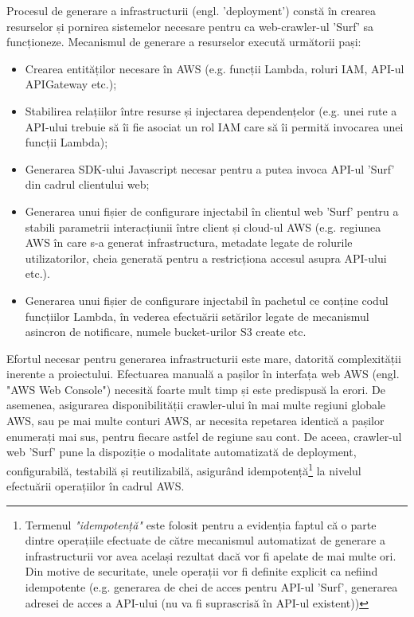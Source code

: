 \newcommand{\descriereIdempotenta}{Termenul \textit{"idempotență"} este folosit pentru a evidenția faptul că o parte dintre operațiile efectuate de către mecanismul automatizat de generare a infrastructurii vor avea același rezultat dacă vor fi apelate de mai multe ori. Din motive de securitate, unele operații vor fi definite explicit ca nefiind idempotente (e.g. generarea de chei de acces pentru API-ul 'Surf', generarea adresei de acces a API-ului (nu va fi suprascrisă în API-ul existent)) }

Procesul de generare a infrastructurii (engl. 'deployment') constă în crearea resurselor și pornirea sistemelor necesare pentru ca web-crawler-ul 'Surf' sa funcționeze. Mecanismul de generare a resurselor execută următorii pași:

\begin{itemize}

	\item{Crearea entităților necesare în AWS (e.g. funcții Lambda, roluri IAM, API-ul APIGateway etc.);}
	
	\item{Stabilirea relațiilor între resurse și injectarea dependențelor (e.g. unei rute a API-ului trebuie să îi fie asociat un rol IAM care să îi permită invocarea unei funcții Lambda);}
	
	\item{Generarea SDK-ului Javascript necesar pentru a putea invoca API-ul 'Surf' din cadrul clientului web;}
	
	\item{Generarea unui fișier de configurare injectabil în clientul web 'Surf' pentru a stabili parametrii interacțiunii între client și cloud-ul AWS (e.g. regiunea AWS în care s-a generat infrastructura, metadate legate de rolurile utilizatorilor, cheia generată pentru a restricționa accesul asupra API-ului etc.).}

  \item{Generarea unui fișier de configurare injectabil în pachetul ce conține codul funcțiilor Lambda, în vederea efectuării setărilor legate de mecanismul asincron de notificare, numele bucket-urilor S3 create etc.}
\end{itemize}

\noindent
Efortul necesar pentru generarea infrastructurii este mare, datorită complexității inerente a proiectului. Efectuarea manuală a pașilor în interfața web AWS (engl. "AWS Web Console") necesită foarte mult timp și este predispusă la erori. De asemenea, asigurarea disponibilității crawler-ului în mai multe regiuni globale AWS, sau pe mai multe conturi AWS, ar necesita repetarea identică a pașilor enumerați mai sus, pentru fiecare astfel de regiune sau cont. De aceea, crawler-ul web 'Surf' pune la dispoziție o modalitate automatizată de deployment, configurabilă, testabilă și reutilizabilă, asigurând idempotență\footnote{\descriereIdempotenta} la nivelul efectuării operațiilor în cadrul AWS.
\\

